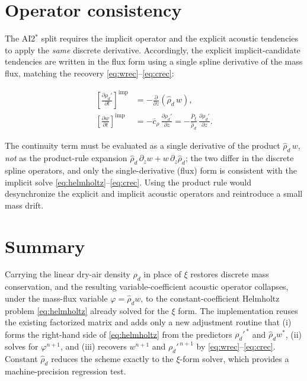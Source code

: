\documentclass[11pt, oneside]{article}   	%
\begin{document}
\section{Operator consistency}

The AI2$^\ast$ split requires the implicit operator and the explicit acoustic
tendencies to apply the \emph{same} discrete derivative. Accordingly, the explicit
implicit-candidate tendencies are written in the flux form using a single spline
derivative of the mass flux, matching the recovery \eqref{eq:wrec}--\eqref{eq:crec}:

\begin{align}
\left[\frac{\partial \rho_d'}{\partial t}\right]^{\mathrm{imp}}
   &= -\frac{\partial}{\partial z}\left(\hat{\rho}_d\, w\right) , \\
\left[\frac{\partial w}{\partial t}\right]^{\mathrm{imp}}
   &= -\bar{c}_\rho\,\frac{\partial \rho_d'}{\partial z}
    = -\frac{\bar{P}_\xi}{\hat{\rho}_d}\,\frac{\partial \rho_d'}{\partial z} .
\end{align}

The continuity term must be evaluated as a single derivative of the product
$\hat{\rho}_d\, w$, \emph{not} as the product-rule expansion
$\hat{\rho}_d\,\partial_z w + w\,\partial_z\hat{\rho}_d$; the two differ in the discrete
spline operators, and only the single-derivative (flux) form is consistent with the
implicit solve \eqref{eq:helmholtz}--\eqref{eq:crec}. Using the product rule would
desynchronize the explicit and implicit acoustic operators and reintroduce a small mass
drift.

\section{Summary}

Carrying the linear dry-air density $\rho_d$ in place of $\xi$ restores discrete mass
conservation, and the resulting variable-coefficient acoustic operator collapses, under
the mass-flux variable $\varphi = \hat{\rho}_d w$, to the constant-coefficient Helmholtz
problem \eqref{eq:helmholtz} already solved for the $\xi$ form. The implementation reuses
the existing factorized matrix and adds only a new adjustment routine that (i) forms the
right-hand side of \eqref{eq:helmholtz} from the predictors $\rho_d'^{\,*}$ and
$\hat{\rho}_d w^{*}$, (ii) solves for $\varphi^{n+1}$, and (iii) recovers
$w^{n+1}$ and $\rho_d'^{\,n+1}$ by \eqref{eq:wrec}--\eqref{eq:crec}. Constant
$\hat{\rho}_d$ reduces the scheme exactly to the $\xi$-form solver, which provides a
machine-precision regression test.
\end{document}
